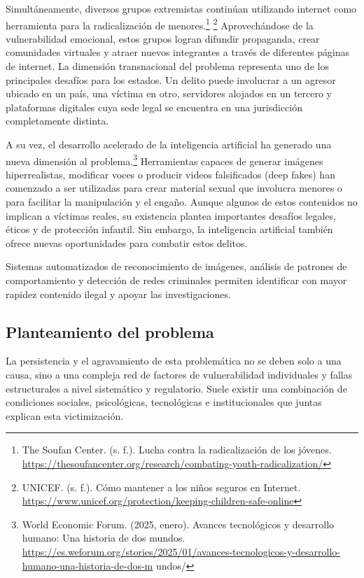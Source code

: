 Simultáneamente, diversos grupos extremistas continúan utilizando internet como herramienta para la radicalización de menores.\footnote{The Soufan Center. (s. f.). Lucha contra la radicalización de los jóvenes. \url{https://thesoufancenter.org/research/combating-youth-radicalization/}} \footnote{UNICEF. (s. f.). Cómo mantener a los niños seguros en Internet. \url{https://www.unicef.org/protection/keeping-children-safe-online}} Aprovechándose de la vulnerabilidad emocional, estos grupos logran difundir propaganda, crear comunidades virtuales y atraer nuevos integrantes a través de diferentes páginas de internet. La dimensión transnacional del problema representa uno de los principales desafíos para los estados. Un delito puede involucrar a un agresor ubicado en un país, una víctima en otro, servidores alojados en un tercero y plataformas digitales cuya sede legal se encuentra en una jurisdicción completamente distinta.

A su vez, el desarrollo acelerado de la inteligencia artificial ha generado una nueva dimensión al problema.\footnote{World Economic Forum. (2025, enero). Avances tecnológicos y desarrollo humano: Una historia de dos mundos. \url{https://es.weforum.org/stories/2025/01/avances-tecnologicos-y-desarrollo-humano-una-historia-de-dos-m} undos/} Herramientas capaces de generar imágenes hiperrealistas, modificar voces o producir videos falsificados (deep fakes) han comenzado a ser utilizadas para crear material sexual que involucra menores o para facilitar la manipulación y el engaño. Aunque algunos de estos contenidos no implican a víctimas reales, su existencia plantea importantes desafíos legales, éticos y de protección infantil. Sin embargo, la inteligencia artificial también ofrece nuevas oportunidades para combatir estos delitos.

Sistemas automatizados de reconocimiento de imágenes, análisis de patrones de comportamiento y detección de redes criminales permiten identificar con mayor rapidez contenido ilegal y apoyar las investigaciones.

\subsection{Planteamiento del problema}

La persistencia y el agravamiento de esta problemática no se deben solo a una causa, sino a una compleja red de factores de vulnerabilidad individuales y fallas estructurales a nivel sistemático y regulatorio. Suele existir una combinación de condiciones sociales, psicológicas, tecnológicas e institucionales que juntas explican esta victimización.

